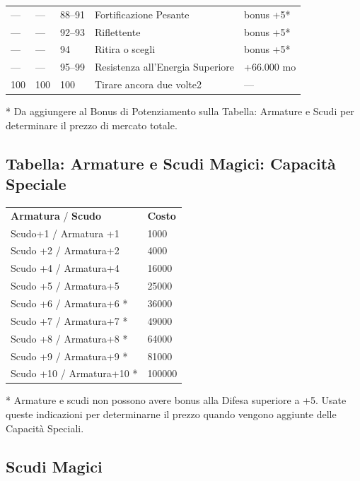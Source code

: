 \documentclass[a4paper,11pt,twoside,openany]{book}
\begin{document}
\begin{tabularx}{0.95\textwidth}{lllXX}
	---             & ---            & 88--91            & Fortificazione Pesante            & bonus +5{*}\\
	---             & ---            & 92--93            & Riflettente       & bonus +5{*}\\
	---             & ---            & 94& Ritira o scegli   & bonus +5{*}\\
	---             & ---            & 95--99            & Resistenza all'Energia Superiore  & +66.000 mo\\
	100             & 100            & 100               & Tirare ancora due volte2          & ---\\
\end{tabularx}

{*} Da aggiungere al Bonus di Potenziamento sulla Tabella: Armature
e Scudi per determinare il prezzo di mercato totale.


\subsection{Tabella: Armature e Scudi Magici: Capacità Speciale}

\label{tabella-armature-e-scudi-magici-capacita-speciale}

\begin{tabular}{ll}
	\toprule
	\textbf{Armatura} / \textbf{Scudo} & \textbf{Costo}\\
	Scudo+1 / Armatura +1              & 1000\\
	Scudo +2 / Armatura+2              & 4000\\
	Scudo +4 / Armatura+4              & 16000\\
	Scudo +5 / Armatura+5              & 25000\\
	Scudo +6 / Armatura+6 {*}          & 36000\\
	Scudo +7 / Armatura+7 {*}          & 49000\\
	Scudo +8 / Armatura+8 {*}          & 64000\\
	Scudo +9 / Armatura+9 {*}          & 81000\\
	Scudo +10 / Armatura+10 {*}        & 100000\\
\end{tabular}

{*} Armature e scudi non possono avere bonus alla Difesa superiore
a +5. Usate queste indicazioni per determinarne il prezzo quando vengono
aggiunte delle Capacità Speciali.

\subsection{Scudi Magici}
\end{document}
